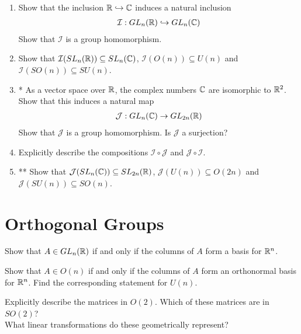 \begin{question}$ $
  \begin{enumerate}
    \item Show that the inclusion $\mathbb{R} \hookrightarrow \mathbb{C}$ induces a natural inclusion
    \begin{align*}
      \mathcal{I}: GL_n(\mathbb{R}) \hookrightarrow GL_n(\mathbb{C})
    \end{align*}
    Show that $\mathcal{I}$ is a group homomorphism.
    \item Show that $\mathcal{I}(SL_n(\mathbb{R})) \subseteq SL_n(\mathbb{C})$, $\mathcal{I}(O(n)) \subseteq U(n)$ and $\mathcal{I}(SO(n)) \subseteq SU(n)$.
    \item* As a vector space over $\mathbb{R}$, the complex numbers $\mathbb{C}$ are isomorphic to $\mathbb{R}^2$. Show that this induces a natural map
    \begin{align*}
      \mathcal{J}: GL_n(\mathbb{C}) \rightarrow GL_{2n}(\mathbb{R})
    \end{align*}
    Show that $\mathcal{J}$ is a group homomorphism. Is $\mathcal{J}$ a surjection?
    \item Explicitly describe the compositions $\mathcal{I} \circ \mathcal{J}$ and $\mathcal{J} \circ \mathcal{I}$.
		\item** Show that $\mathcal{J}(SL_n(\mathbb{C})) \subseteq SL_{2n}(\mathbb{R})$, $\mathcal{J}(U(n)) \subseteq O(2n)$ and $\mathcal{J}(SU(n)) \subseteq SO(n)$.
  \end{enumerate}
\end{question}






\newpage
\section{Orthogonal Groups}
\begin{question}
	Show that $A \in GL_n(\mathbb{R})$ if and only if the columns of $A$ form a basis for $\mathbb{R}^n$.
\end{question}

\begin{question}
		Show that $A \in O(n)$ if and only if the columns of $A$ form an orthonormal basis for $\mathbb{R}^n$. Find the corresponding statement for $U(n)$.
\end{question}

\begin{question}
	Explicitly describe the matrices in $O(2)$. Which of these matrices are in $SO(2)$?\\ What linear transformations do these geometrically represent?
\end{question}

